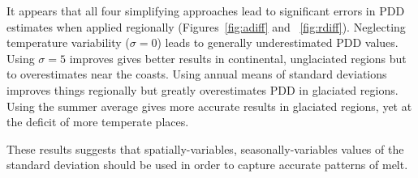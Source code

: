 \documentclass[twocolumn]{igs}
\begin{document}
It appears that all four simplifying approaches lead to significant errors in PDD estimates when applied regionally (Figures~\ref{fig:adiff} and ~\ref{fig:rdiff}). Neglecting temperature variability ($\sigma=0$) leads to generally underestimated PDD values. Using $\sigma=5$ improves gives better results in continental, unglaciated regions but to overestimates near the coasts. Using annual means of standard deviations improves things regionally but greatly overestimates PDD in glaciated regions. Using the summer average gives more accurate results in glaciated regions, yet at the deficit of more temperate places.

These results suggests that spatially-variables, seasonally-variables values of the standard deviation should be used in order to capture accurate patterns of melt.



\end{document}
